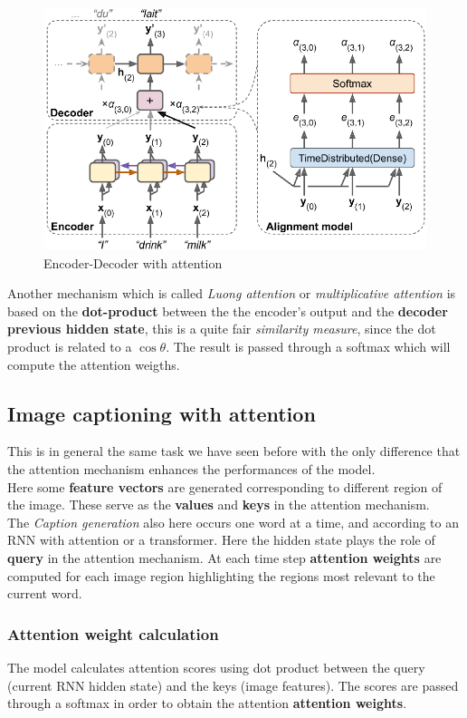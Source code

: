 \begin{figure}
    \centering
    \includegraphics[scale=0.6]{img/attention_1.png}
    \caption{Encoder-Decoder with attention}
\end{figure}

Another mechanism which is called \textit{Luong attention} or \textit{multiplicative attention} is based on the \textbf{dot-product} between the the encoder's output and the \textbf{decoder previous hidden state}, this is a quite fair \textit{similarity measure}, since the dot product is related to a $\cos \theta$. The result is passed through a softmax which will compute the attention weigths.

\subsection{Image captioning with attention}
This is in general the same task we have seen before with the only difference that the attention mechanism enhances the performances of the model.\\
\noindent
Here some \textbf{feature vectors} are generated corresponding to different region of the image. These serve as the \textbf{values} and \textbf{keys} in the attention mechanism. \\ The \textit{Caption generation} also here occurs one word at a time, and  according to an RNN with attention or a transformer. Here the hidden state plays the role of \textbf{query} in the attention mechanism. At each time step \textbf{attention weights} are computed for each image region highlighting the regions most relevant to the current word.

\subsubsection{Attention weight calculation}
The model calculates attention scores using dot product between the query (current RNN hidden state) and the keys (image features). The scores are passed through a softmax in order to obtain the attention \textbf{attention weights}.


